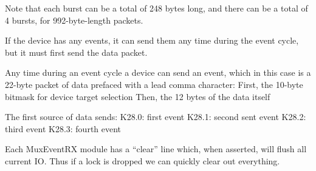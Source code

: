Note that each burst can be a total of 248 bytes long, and
there can be a total of 4 bursts, for 992-byte-length packets. 


If the device has any events, it can send them any time during
the event cycle, but it must first send the data packet.

Any time during an event cycle a device can send an event, which in
this case is a 22-byte packet of data prefaced with a lead comma
character:
  First, the 10-byte bitmask for device target selection
  Then, the 12 bytes of the data itself

The first source of data sends: 
K28.0: first event
K28.1: second sent event
K28.2: third event
K28.3: fourth event

Each MuxEventRX module has a ``clear'' line which, when asserted, will
flush all current IO. Thus if a lock is dropped we can quickly clear
out everything.

